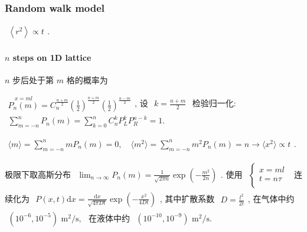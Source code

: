 \documentclass[../../main.tex]{subfiles}
\begin{document}
\subsubsection{Random walk model}

$\begin{aligned}
    \left\langle r^{2}\right\rangle\propto t
\end{aligned}$. 

\paragraph{$n$ steps on 1D lattice} $n$ 步后处于第 $m$ 格的概率为

$\begin{aligned}
    \stackrel{x = ml}{P_{n}(m)} = C_{n}^{\frac{n+m}{2}}\left(\frac{1}{2}\right)^{\frac{n+m}{2}}\left(\frac{1}{2}\right)^{\frac{n-m}{2}}
\end{aligned}$, 设 $\begin{aligned}
    k=\frac{n+m}{2}
\end{aligned}$ 检验归一化: $\begin{aligned}
    \sum_{m=-n}^{n}P_{n}(m) = \sum_{k=0}^{n}C_{n}^{k}P_{L}^{k}P_{R}^{n-k} = 1.
\end{aligned}$

$\begin{aligned}
    \langle m\rangle = \sum_{m=-n}^{n}mP_{n}(m) = 0,\quad \langle m^{2}\rangle = \sum_{m=-n}^{n}m^{2}P_{n}(m) = n\rightarrow \langle x^{2}\rangle\propto t
\end{aligned}$. 

极限下取高斯分布 $\begin{aligned}
    \lim_{n\rightarrow\infty}P_{n}(m) = \frac{1}{\sqrt{2\pi n}}\exp{\left(-\frac{m^{2}}{2n}\right)}
\end{aligned}$. 使用 $\begin{aligned}
    \left\{\begin{aligned}
        x=ml\\
        t=n\tau\\
    \end{aligned}\right. 
\end{aligned}$ 连续化为 $\begin{aligned}
    P(x,t)\mathrm{d}x = \frac{\mathrm{d}x}{\sqrt{4\pi Dt}}\exp{\left(-\frac{x^{2}}{4Dt}\right)}
\end{aligned}$, 其中扩散系数 $\begin{aligned}
    D = \frac{l^{2}}{2t}
\end{aligned}$, 在气体中约 $\begin{aligned}
    \left(10^{-6},10^{-5}\right)\text{ m}^{2}/\text{s},
\end{aligned}$ 在液体中约 $\begin{aligned}
    \left(10^{-10},10^{-9}\right)\text{ m}^{2}/\text{s}.
\end{aligned}$
\end{document}
